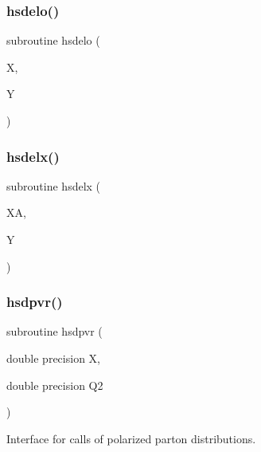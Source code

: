 \mbox{\label{djangoh__h_8f_a13f8e2a9bca26ea6b144d7f7c2c77683}} 
\subsubsection{\texorpdfstring{hsdelo()}{hsdelo()}}
{\footnotesize\ttfamily subroutine hsdelo (\begin{DoxyParamCaption}\item[{}]{X,  }\item[{}]{Y }\end{DoxyParamCaption})}

\mbox{\label{djangoh__h_8f_ad7162d5427175126bfe004753ea1bd70}} 
\subsubsection{\texorpdfstring{hsdelx()}{hsdelx()}}
{\footnotesize\ttfamily subroutine hsdelx (\begin{DoxyParamCaption}\item[{}]{XA,  }\item[{}]{Y }\end{DoxyParamCaption})}

\mbox{\label{djangoh__h_8f_a036460f40105c386bb59c0ba11b4646b}} 
\subsubsection{\texorpdfstring{hsdpvr()}{hsdpvr()}}
{\footnotesize\ttfamily subroutine hsdpvr (\begin{DoxyParamCaption}\item[{double precision}]{X,  }\item[{double precision}]{Q2 }\end{DoxyParamCaption})}



Interface for calls of polarized parton distributions. 

\mbox{\label{djangoh__h_8f_ac5b04e0e69f49199fe393e884e650faf}} 
